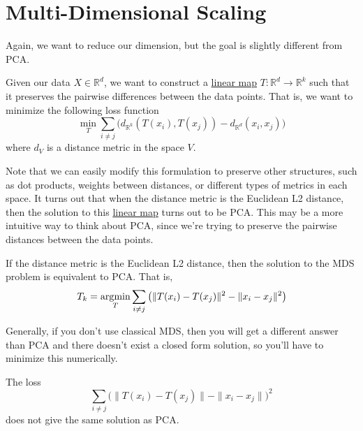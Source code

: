 \section{Multi-Dimensional Scaling}

  Again, we want to reduce our dimension, but the goal is slightly different from PCA. 

  \begin{definition}
    \label{def:multi-dimensional-scaling}
    Given our data $X \in \mathbb{R}^d$, we want to construct a \hyperref[lin-def:linear_map]{linear map} $T: \mathbb{R}^d \rightarrow \mathbb{R}^k$ such that it preserves the pairwise differences between the data points. That is, we want to minimize the following loss function 
    \begin{equation}
      \min_{T} \sum_{i \neq j} \big( d_{\mathbb{R}^k}(T(x_i), T(x_j)) - d_{\mathbb{R}^d}(x_i, x_j) \big)
    \end{equation}
    where $d_{V}$ is a distance metric in the space $V$. 
  \end{definition}

  Note that we can easily modify this formulation to preserve other structures, such as dot products, weights between distances, or different types of metrics in each space. It turns out that when the distance metric is the Euclidean L2 distance, then the solution to this \hyperref[lin-def:linear_map]{linear map} turns out to be PCA. This may be a more intuitive way to think about PCA, since we're trying to preserve the pairwise distances between the data points. 

  \begin{theorem}
    \label{thm:equivalence-of-classical-mds-and-pca}
    If the distance metric is the Euclidean L2 distance, then the solution to the MDS problem is equivalent to PCA. That is, 
    \begin{equation}
      T_k = \operatorname*{\arg\!\min}_{T} \sum_{i \neq j} \big( \|T(x_i) - T(x_j)\|^2 - \|x_i - x_j\|^2 \big)
    \end{equation}
  \end{theorem}

  Generally, if you don't use classical MDS, then you will get a different answer than PCA and there doesn't exist a closed form solution, so you'll have to minimize this numerically. 

  \begin{example}
    \label{ex:non-classical-mds}
    The loss 
    \begin{equation}
      \sum_{i \neq j}  \big( \|T(x_i) - T(x_j)\| - \|x_i - x_j\| \big)^2 
    \end{equation}
    does not give the same solution as PCA. 
  \end{example}

